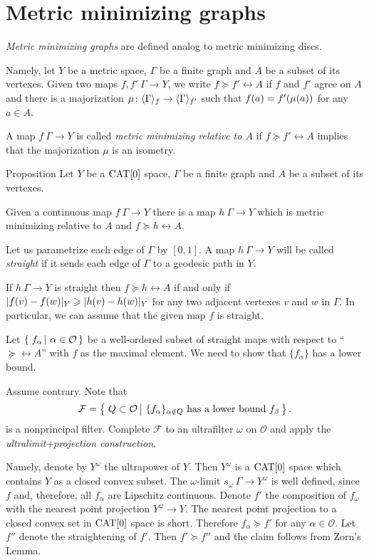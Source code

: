\section{Metric minimizing graphs}\label{Metric minimizing graphs}

\emph{Metric minimizing graphs} are defined analog to metric minimizing discs.

Namely, let $Y$ be a metric space, $\Gamma$ be a finite graph and $A$ be a subset of its vertexes.
Given two maps $f,f'\:\Gamma\to Y$, we write $f\succcurlyeq f'\rel A$ if $f$ and $f'$ agree on $A$ 
and there is a majorization $\mu\colon\langle\Gamma\rangle_f\to \langle\Gamma\rangle_{f'}$
such that $f(a)\zz=f'(\mu(a))$ for any $a\in A$.

A map $f\:\Gamma\to Y$ is called \emph{metric minimizing relative to $A$} if $f\succcurlyeq f'\rel A$ implies that the majorization $\mu$ is an isometry.

\begin{thm}{Proposition}\label{prop:metric-min-graph-exist}
Let $Y$ be a $\mathop{\rm CAT}\nolimits[0]$ space, 
$\Gamma$ be a finite graph and $A$ be a subset of its vertexes.

Given a continuous map $f\:\Gamma\to Y$ there is a map $h\:\Gamma\to Y$ 
which is metric minimizing relative to $A$ and $f\succcurlyeq h\rel A$.
\end{thm}

Let us parametrize each edge of $\Gamma$ by $[0,1]$.
A map $h\:\Gamma\to Y$ will be called \emph{straight} if it
sends each edge of $\Gamma$ to a geodesic path in $Y$.

If $h\:\Gamma\to Y$ is straight then $f\succcurlyeq h\rel A$ if and only if 
$|f(v)-f(w)|_Y\zz\ge |h(v)-h(w)|_Y$
for any two adjacent vertexes $v$ and $w$ in $\Gamma$.
In particular, we can assume that the given map $f$ is straight.

Let $\set{f_\alpha}{\alpha\in \mathcal{O}}$ be a well-ordered subset of straight maps with respect to ``$\succcurlyeq\rel A$'' 
with $f$ as the maximal element. 
We need to show that $\{f_\alpha\}$ has a lower bound.

Assume contrary.
Note that
$$
\mathcal{F}
=
\set{Q\subset\mathcal{O}}{\{f_\alpha\}_{\alpha\notin Q}\text{ has a lower bound } f_\beta}.
$$
is a nonprincipal filter.
Complete $\mathcal{F}$ to an ultrafilter $\omega$ on $\mathcal{O}$ and apply the \emph{ultralimit+projection construction}.

Namely, denote by $Y^\omega$ the ultrapower of $Y$. 
Then $Y^\omega$
is a $\mathop{\rm CAT}\nolimits[0]$ space which contains $Y$ as a closed convex subset. 
The $\omega$-limit $s_\omega\:\Gamma\to Y^\omega$ is well defined, since
$f$ and, therefore, all $f_\alpha$ are Lipschitz continuous. 
Denote $f'$ the composition of $f_\omega$ with the nearest point projection $Y^\omega\to Y$.
The nearest point projection to a closed convex set in $\mathop{\rm CAT}\nolimits[0]$ space is short.
Therefore $f_\alpha\succcurlyeq f'$ for any $\alpha\in \mathcal{O}$. Let $f''$ denote the straightening of $f'$.
Then $f'\succcurlyeq f''$ and the claim follows from Zorn's Lemma.
\qeds


